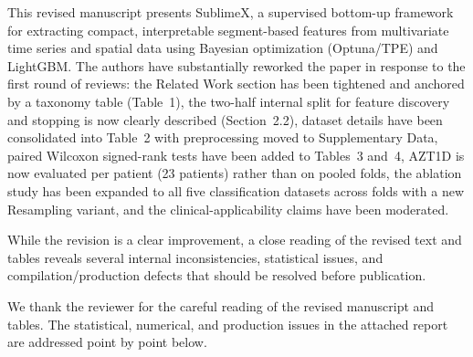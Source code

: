 \documentclass[11pt]{article}
\makeatletter
\newcommand{\rsp}{\par\vspace{0.9em}}
\newcommand{\rc}[1]{\begin{reviewerbox}#1\end{reviewerbox}}
\newcommand{\response}[2]{%
  \begin{responsebox}#1%
  \def\@responseitems{#2}%
  \ifx\@responseitems\empty\else\begin{itemize}[nosep,leftmargin=1.2em]#2\end{itemize}\fi
  \end{responsebox}\rsp}
\makeatother
\begin{document}
\rc{This revised manuscript presents SublimeX, a supervised bottom-up framework for extracting compact, interpretable segment-based features from multivariate time series and spatial data using Bayesian optimization (Optuna/TPE) and LightGBM. The authors have substantially reworked the paper in response to the first round of reviews: the Related Work section has been tightened and anchored by a taxonomy table (Table~1), the two-half internal split for feature discovery and stopping is now clearly described (Section~2.2), dataset details have been consolidated into Table~2 with preprocessing moved to Supplementary Data, paired Wilcoxon signed-rank tests have been added to Tables~3 and~4, AZT1D is now evaluated per patient (23 patients) rather than on pooled folds, the ablation study has been expanded to all five classification datasets across folds with a new Resampling variant, and the clinical-applicability claims have been moderated.\par\smallskip
While the revision is a clear improvement, a close reading of the revised text and tables reveals several internal inconsistencies, statistical issues, and compilation/production defects that should be resolved before publication.}

\response{We thank the reviewer for the careful reading of the revised manuscript and tables. The statistical, numerical, and production issues in the attached report are addressed point by point below.}{}
\end{document}
